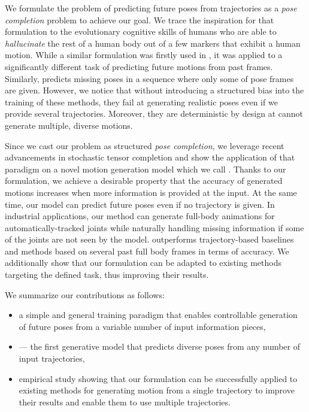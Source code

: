 \documentclass[10pt,twocolumn,letterpaper]{article}
\begin{document}
We formulate the problem of predicting future poses from trajectories as a \textit{pose completion} problem to achieve our goal. We trace the inspiration for that formulation to the evolutionary cognitive skills of humans who are able to \textit{hallucinate} \cite{johansson1973visual} the rest of a human body out of a few markers that exhibit a human motion. While a similar formulation was firstly used in \cite{hernandez2019human}, it was applied to a significantly different task of predicting future motions from past frames. Similarly, \cite{kaufmann2020convolutional} predicts missing poses in a sequence where only some of pose frames are given. However, we notice that without introducing a structured bias into the training of these methods, they fail at generating realistic poses even if we provide several trajectories. Moreover, they are deterministic by design at cannot generate multiple, diverse motions. 

Since we cast our problem as structured \textit{pose completion}, we leverage recent advancements in stochastic tensor completion \cite{zheng2019pluralistic} and show the application of that paradigm on a novel motion generation model which we call \trajevae{}. Thanks to our formulation, we achieve a desirable property that the accuracy of generated motions increases when more information is provided at the input. 
At the same time, our model can predict future poses even if no trajectory is given. 
In industrial applications, our method can generate full-body animations for automatically-tracked joints while naturally handling missing information if some of the joints are not seen by the model. \trajevae{} outperforms trajectory-based baselines and methods based on several past full body frames in terms of accuracy. We additionally show that our formulation can be adapted to existing methods targeting the defined task, thus improving their results.

We summarize our contributions as follows:
\begin{itemize}
    \item a simple and general training paradigm that enables controllable generation of future poses from a variable number of input information pieces,
    \item \trajevae{} --- the first generative model that predicts diverse poses from any number of input trajectories,
    \item empirical study showing that our formulation can be successfully applied to existing methods for generating motion from a single trajectory to improve their results and enable them to use multiple trajectories.
\end{itemize}
\end{document}
